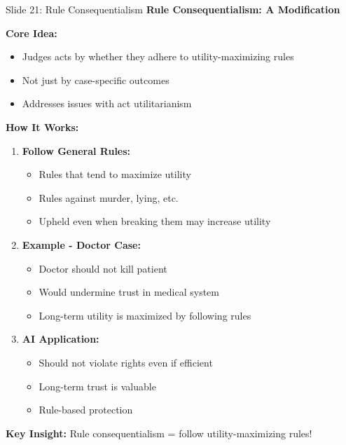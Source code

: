 \documentclass[8pt]{beamer}
\begin{document}
	\begin{frame}{Slide 21: Rule Consequentialism}
		\fontsize{6.5}{7.5}\selectfont
		\textbf{Rule Consequentialism: A Modification}
		
		\vspace{0.1cm}
		\textbf{Core Idea:}
		\begin{itemize}
			\item Judges acts by whether they adhere to utility-maximizing rules
			\item Not just by case-specific outcomes
			\item Addresses issues with act utilitarianism
		\end{itemize}
		
		\vspace{0.1cm}
		\textbf{How It Works:}
		\begin{enumerate}
			\item \textbf{Follow General Rules:}
			\begin{itemize}
				\item Rules that tend to maximize utility
				\item Rules against murder, lying, etc.
				\item Upheld even when breaking them may increase utility
			\end{itemize}
			\item \textbf{Example - Doctor Case:}
			\begin{itemize}
				\item Doctor should not kill patient
				\item Would undermine trust in medical system
				\item Long-term utility is maximized by following rules
			\end{itemize}
			\item \textbf{AI Application:}
			\begin{itemize}
				\item Should not violate rights even if efficient
				\item Long-term trust is valuable
				\item Rule-based protection
			\end{itemize}
		\end{enumerate}
		
		\textcolor{myblue}{\textbf{Key Insight:}} Rule consequentialism = \textcolor{myblue}{follow utility-maximizing rules}!
	\end{frame}
	
\end{document}
